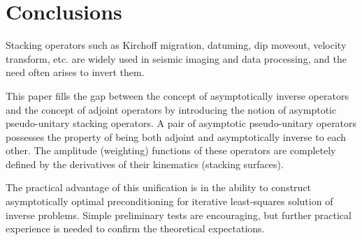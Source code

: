 \section{Conclusions}
\par
Stacking operators such as Kirchoff migration, datuming, dip moveout,
velocity transform, etc. are widely used in seismic imaging and data 
processing, and the need often arises to invert them. 

This paper fills the gap between the concept of asymptotically inverse
operators and the concept of adjoint operators by introducing the notion of
asymptotic pseudo-unitary stacking operators. A pair of asymptotic
pseudo-unitary operators possesses the property of being both adjoint and
asymptotically inverse to each other. The amplitude (weighting) functions of
these operators are completely defined by the derivatives of their 
kinematics (stacking surfaces).

The practical advantage of this unification is in the ability to
construct asymptotically optimal preconditioning for iterative
least-squares solution of inverse problems. Simple preliminary tests
are encouraging, but further practical experience is needed to confirm
the theoretical expectations.



